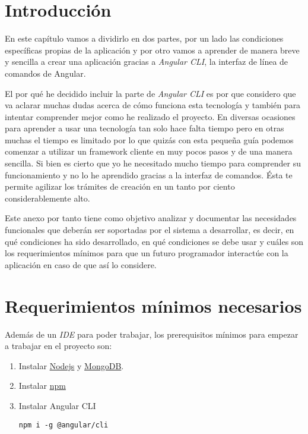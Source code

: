 
\section{Introducción}\label{introduccion-programador}
En este capítulo vamos a dividirlo en dos partes, por un lado las condiciones específicas propias de la aplicación y por otro vamos a aprender de manera breve y sencilla a crear una aplicación gracias a \emph{Angular CLI}, la interfaz de línea de comandos de Angular.

El por qué he decidido incluir la parte de \emph{Angular CLI} es por que considero que va aclarar muchas dudas acerca de cómo funciona esta tecnología y también para intentar comprender mejor como he realizado el proyecto. En diversas ocasiones para aprender a usar una tecnología tan solo hace falta tiempo pero en otras muchas el tiempo es limitado por lo que quizás con esta pequeña guía podemos comenzar a utilizar un framework cliente en muy pocos pasos y de una manera sencilla. Si bien es cierto que yo he necesitado mucho tiempo para comprender su funcionamiento y no lo he aprendido gracias a la interfaz de comandos. Ésta te permite agilizar los trámites de creación en un tanto por ciento considerablemente alto.

Este anexo por tanto tiene como objetivo analizar y documentar las necesidades funcionales que deberán ser soportadas por el sistema a desarrollar, es decir, en qué condiciones ha sido desarrollado, en qué condiciones se debe usar y cuáles son los requerimientos mínimos para que un futuro programador interactúe con la aplicación en caso de que así lo considere.

\section{Requerimientos mínimos necesarios}
Además de un \emph{IDE} \cite{ides} para poder trabajar, los prerequisitos mínimos para empezar a trabajar en el proyecto son:

\begin{enumerate}
	\item Instalar \href{https://nodejs.org/en/}{Nodejs} y \href{https://www.mongodb.com/}{MongoDB}.
	\item Instalar \href{https://www.npmjs.com/}{npm}
	\item Instalar Angular CLI
		\lstset{language=C, breaklines=true, basicstyle=\footnotesize}
		\begin{lstlisting}[frame=single]
		npm i -g @angular/cli
    	\end{lstlisting}
\end{enumerate}

